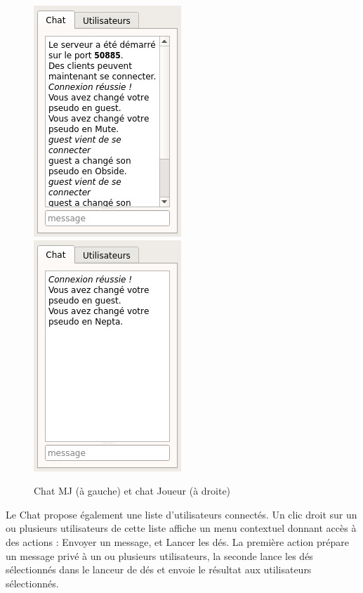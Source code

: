 \documentclass[11pt]{article}
\begin{document}
\begin{figure}[h!]
	\centering
	\includegraphics[scale=0.5]{img/chat_mj.jpg}
	\hspace{10 mm}
	\includegraphics[scale=0.5]{img/chat_player.jpg}
	\caption{Chat MJ (à gauche) et chat Joueur (à droite)}
\end{figure}

Le Chat propose également une liste d'utilisateurs connectés. Un clic droit sur un ou plusieurs utilisateurs de cette liste affiche un menu contextuel donnant accès à des actions : Envoyer un message, et Lancer les dés.
La première action prépare un message privé à un ou plusieurs utilisateurs, la seconde lance les dés sélectionnés dans le lanceur de dés et envoie le résultat aux utilisateurs sélectionnés.
\end{document}
